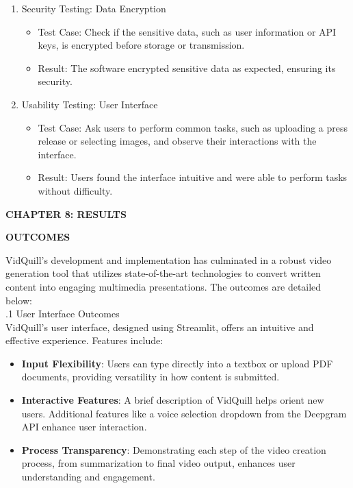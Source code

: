 \documentclass[12pt]{article}
\begin{document}
\begin{enumerate}
    \item Security Testing: Data Encryption
    \begin{itemize}
        \item Test Case: Check if the sensitive data, such as user information or API keys, is encrypted before storage or transmission.
        \item Result: The software encrypted sensitive data as expected, ensuring its security.
    \end{itemize}

    \item Usability Testing: User Interface
    \begin{itemize}
        \item Test Case: Ask users to perform common tasks, such as uploading a press release or selecting images, and observe their interactions with the interface.
        \item Result: Users found the interface intuitive and were able to perform tasks without difficulty.
    \end{itemize}
    
\end{enumerate}


\pagebreak{}
\begin{center} \fontsize{14}{14} \textbf{CHAPTER 8: RESULTS } \end{center}

\justify \textbf{\fontsize{12}{12} OUTCOMES }
\bigskip

VidQuill's development and implementation has culminated in a robust video generation tool that utilizes state-of-the-art technologies to convert written content into engaging multimedia presentations. The outcomes are detailed below:\\


.1 User Interface Outcomes\\

VidQuill's user interface, designed using Streamlit, offers an intuitive and effective experience. Features include:
\begin{itemize}
  \item \textbf{Input Flexibility}: Users can type directly into a textbox or upload PDF documents, providing versatility in how content is submitted.
  \item \textbf{Interactive Features}: A brief description of VidQuill helps orient new users. Additional features like a voice selection dropdown from the Deepgram API enhance user interaction.
  \item \textbf{Process Transparency}: Demonstrating each step of the video creation process, from summarization to final video output, enhances user understanding and engagement.
\end{itemize}
\end{document}
